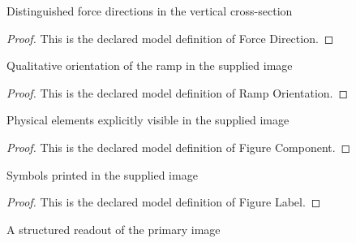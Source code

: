 \begin{definition}
  \label{def:physics:phyx-mini-0759:phyxminiproblems-problemphyxmini0759-forcedirection}
  Distinguished force directions in the vertical cross-section
\end{definition}
\begin{proof}
  This is the declared model definition of Force Direction.
\end{proof}
\begin{definition}
  \label{def:physics:phyx-mini-0759:phyxminiproblems-problemphyxmini0759-ramporientation}
  Qualitative orientation of the ramp in the supplied image
\end{definition}
\begin{proof}
  This is the declared model definition of Ramp Orientation.
\end{proof}
\begin{definition}
  \label{def:physics:phyx-mini-0759:phyxminiproblems-problemphyxmini0759-figurecomponent}
  Physical elements explicitly visible in the supplied image
\end{definition}
\begin{proof}
  This is the declared model definition of Figure Component.
\end{proof}
\begin{definition}
  \label{def:physics:phyx-mini-0759:phyxminiproblems-problemphyxmini0759-figurelabel}
  Symbols printed in the supplied image
\end{definition}
\begin{proof}
  This is the declared model definition of Figure Label.
\end{proof}
\begin{definition}
  \label{def:physics:phyx-mini-0759:phyxminiproblems-problemphyxmini0759-suppliedfigure}
  A structured readout of the primary image
\end{definition}
